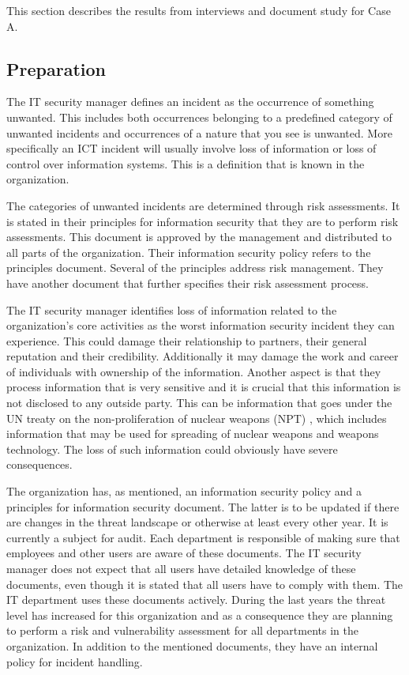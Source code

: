 This section describes the results from interviews and document study for Case A. 

\subsection{Preparation}
The IT security manager defines an incident %
as the occurrence of something unwanted. This includes both occurrences belonging to a predefined category of unwanted incidents and occurrences of a nature that you see is unwanted. More specifically an \ac{ICT} incident will usually involve loss of information or loss of control over information systems. This is a definition that is known in the organization. 

The categories of unwanted incidents are determined through risk assessments. It is stated in their principles for information security that they are to perform risk assessments. This document is approved by the management and distributed to all parts of the organization. Their information security policy refers to the principles document. Several of the principles address risk management. They have another document that further specifies their risk assessment process. %

The IT security manager identifies loss of information related to the organization's core activities as the worst information security incident they can experience. This could damage their relationship to partners, their general reputation and their credibility. Additionally it may damage the work and career of individuals with ownership of the information. %
Another aspect is that they process information that is very sensitive and it is crucial that this information is not disclosed to any outside party. This can be information that goes under the \ac{UN} treaty on the non-proliferation of nuclear weapons (NPT) \cite{NPT}, which includes information that may be used for spreading of nuclear weapons and weapons technology. %
The loss of such information could obviously have severe consequences.

The organization has, as mentioned, an information security policy and a principles for information security document. The latter is to be updated if there are changes in the threat landscape or otherwise at least every other year. It is currently a subject for audit. Each department is responsible of making sure that employees and other users are aware of these documents. The IT security manager does not expect that all users have detailed knowledge of these documents, even though it is stated that all users have to comply with them. The IT department uses these documents actively. %
During the last years the threat level has increased for this organization and as a consequence they are planning to perform a risk and vulnerability assessment for all departments in the organization. In addition to the mentioned documents, they have an internal policy for incident handling.


